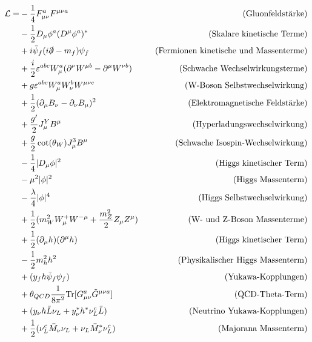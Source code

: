 \documentclass{article}
\begin{document}
	\begin{equation}
		\begin{aligned}
			\mathcal{L} = & -\frac{1}{4} F_{\mu\nu}^a F^{\mu\nu a} \quad &\text{(Gluonfeldstärke)} \\
			& -\frac{1}{2} D_\mu \phi^a (D^\mu \phi^a)^* \quad &\text{(Skalare kinetische Terme)} \\
			& + i \bar{\psi}_f (i \slashed{\partial} - m_f) \psi_f \quad &\text{(Fermionen kinetische und Massenterme)} \\
			& + \frac{i}{2} \varepsilon^{abc} W_\mu^a (\partial^\nu W^{\mu b} - \partial^\mu W^{\nu b}) \quad &\text{(Schwache Wechselwirkungsterme)} \\
			& + g \varepsilon^{abc} W_\mu^a W_\nu^b W^{\mu\nu c} \quad &\text{(W-Boson Selbstwechselwirkung)} \\
			& + \frac{1}{2} (\partial_\mu B_\nu - \partial_\nu B_\mu)^2 \quad &\text{(Elektromagnetische Feldstärke)} \\
			& + \frac{g'}{2} J_\mu^Y B^\mu \quad &\text{(Hyperladungswechselwirkung)} \\
			& + \frac{g}{2} \cot(\theta_W) J_\mu^3 B^\mu \quad &\text{(Schwache Isospin-Wechselwirkung)} \\
			& -\frac{1}{4} |D_\mu \phi|^2 \quad &\text{(Higgs kinetischer Term)} \\
			& - \mu^2 |\phi|^2 \quad &\text{(Higgs Massenterm)} \\
			& - \frac{\lambda}{4} |\phi|^4 \quad &\text{(Higgs Selbstwechselwirkung)} \\
			& + \frac{1}{2} (m_W^2 W_\mu^+ W^{-\mu} + \frac{m_Z^2}{2} Z_\mu Z^\mu) \quad &\text{(W- und Z-Boson Massenterme)} \\
			& + \frac{1}{2} (\partial_\mu h)(\partial^\mu h) \quad &\text{(Higgs kinetischer Term)} \\
			& - \frac{1}{2} m_h^2 h^2 \quad &\text{(Physikalischer Higgs Massenterm)} \\
			& + (y_f h \bar{\psi}_f \psi_f) \quad &\text{(Yukawa-Kopplungen)} \\
			& + \theta_{QCD} \frac{1}{8\pi^2} \text{Tr}[G_{\mu\nu}^a \tilde{G}^{\mu\nu a}] \quad &\text{(QCD-Theta-Term)} \\
			& + (y_\nu h \bar{L} \nu_L + y_\nu^* h^* \nu_L^c \bar{L}) \quad &\text{(Neutrino Yukawa-Kopplungen)} \\
			& + \frac{1}{2} (\nu_L^c \bar{M}_\nu \nu_L + \nu_L \bar{M}_\nu^* \nu_L^c) \quad &\text{(Majorana Massenterm)}
		\end{aligned}
	\end{equation}
\end{document}
